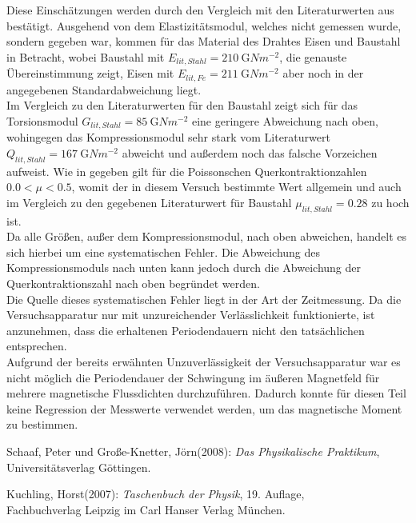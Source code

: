     Diese Einschätzungen werden durch den Vergleich mit den Literaturwerten aus\,\cite{Kuchling07} bestätigt. Ausgehend von dem Elastizitätsmodul,
    welches nicht gemessen wurde, sondern gegeben war, kommen für das Material des Drahtes Eisen und Baustahl in Betracht,
    wobei Baustahl mit $E_{lit,Stahl} = \SI{210}{\giga Nm^{-2}}$, die genauste Übereinstimmung zeigt, 
    Eisen mit $E_{lit,Fe} = \SI{211}{\giga Nm^{-2}}$ aber noch in der angegebenen Standardabweichung liegt.\\
    Im Vergleich zu den Literaturwerten für den Baustahl zeigt sich für das Torsionsmodul $G_{lit,Stahl} =\SI{85}{\giga Nm^{-2}}$ eine 
    geringere Abweichung nach oben, wohingegen das Kompressionsmodul sehr stark vom Literaturwert $Q_{lit,Stahl} =\SI{167}{\giga Nm^{-2}}$ abweicht
    und außerdem noch das falsche Vorzeichen aufweist. Wie in \cite[S.189]{Kuchling07} gegeben gilt für die Poissonschen Querkontraktionzahlen
    $\num{0,0} < \mu < \num{0,5} $, womit der in diesem Versuch bestimmte Wert allgemein und auch im Vergleich zu den gegebenen Literaturwert
    für Baustahl $\mu_{lit,Stahl} =\num{0,28}$ zu hoch ist.\\
    
    Da alle Größen, außer dem Kompressionsmodul, nach oben abweichen, handelt es sich hierbei um eine systematischen Fehler.
    Die Abweichung des Kompressionsmoduls nach unten kann jedoch durch die Abweichung der Querkontraktionszahl nach oben begründet werden.\\
    Die Quelle dieses systematischen Fehler liegt in der Art der Zeitmessung. Da die Versuchsapparatur nur mit unzureichender Verlässlichkeit
    funktionierte, ist anzunehmen, dass die erhaltenen Periodendauern nicht den tatsächlichen entsprechen.\\
    
    Aufgrund der bereits erwähnten Unzuverlässigkeit der Versuchsapparatur war es nicht möglich die Periodendauer der
    Schwingung im äußeren Magnetfeld für mehrere magnetische Flussdichten durchzuführen. Dadurch konnte für diesen
    Teil keine Regression der Messwerte verwendet werden, um das magnetische Moment zu bestimmen.
  
  \newpage
  \begin{thebibliography}{9}


     Schaaf, Peter und Große-Knetter, Jörn(2008): \emph{Das Physikalische Praktikum},\\
                       Universitätsverlag Göttingen.

     Kuchling, Horst(2007): \emph{Taschenbuch der Physik},
                       19. Auflage,\\ Fachbuchverlag Leipzig im Carl Hanser Verlag München.


  \end{thebibliography}

 


